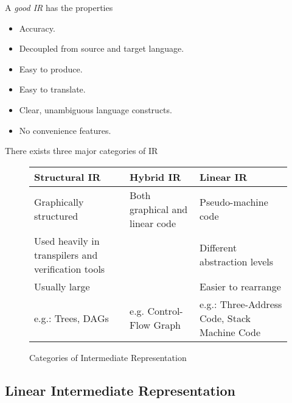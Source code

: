 \begin{definition}
    A \textit{good IR} has the properties
    \begin{itemize}
        \item Accuracy.
        \item Decoupled from source and target language.
        \item Easy to produce.
        \item Easy to translate.
        \item Clear, unambiguous language constructs.
        \item No convenience features.
    \end{itemize}
\end{definition}

\begin{definition}[IR Categories]
    There exists three major categories of IR
    \begin{figure}[H]
        \centering
        \begin{tabularx}{\textwidth}{@{} X X X @{}}
            \toprule
            Structural IR & Hybrid IR & Linear IR \\
            \midrule
            Graphically structured & Both graphical and linear code & Pseudo-machine code \\
            Used heavily in transpilers and verification tools & & Different abstraction levels \\
            Usually large & & Easier to rearrange \\
            \midrule
            e.g.: Trees, DAGs & e.g. Control-Flow Graph & e.g.: Three-Address Code, Stack Machine Code \\
            \bottomrule
        \end{tabularx}
        \caption{Categories of Intermediate Representation}
        \label{fig:ir-categories}
    \end{figure}
\end{definition}

\subsection{Linear Intermediate Representation}

